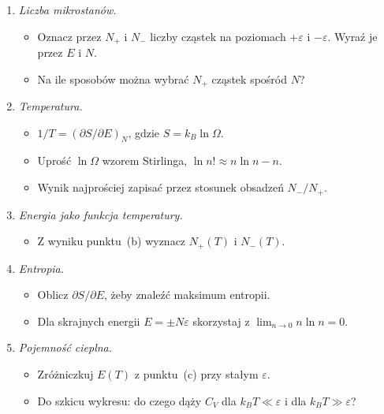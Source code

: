 \begin{wskazowki}
\begin{enumerate}[label=(\alph*)]
  \item \textit{Liczba mikrostanów.}
    \begin{itemize}
      \item Oznacz przez $N_+$ i $N_-$ liczby cząstek na poziomach $+\varepsilon$
        i $-\varepsilon$. Wyraź je przez $E$ i $N$.
      \item Na ile sposobów można wybrać $N_+$ cząstek spośród $N$?
    \end{itemize}
  \item \textit{Temperatura.}
    \begin{itemize}
      \item $1/T = (\partial S/\partial E)_N$, gdzie $S = k_B\ln\Omega$.
      \item Uprość $\ln\Omega$ wzorem Stirlinga, $\ln n! \approx n\ln n - n$.
      \item Wynik najprościej zapisać przez stosunek obsadzeń $N_-/N_+$.
    \end{itemize}
  \item \textit{Energia jako funkcja temperatury.}
    \begin{itemize}
      \item Z wyniku punktu~(b) wyznacz $N_+(T)$ i $N_-(T)$.
    \end{itemize}
  \item \textit{Entropia.}
    \begin{itemize}
      \item Oblicz $\partial S/\partial E$, żeby znaleźć maksimum entropii.
      \item Dla skrajnych energii $E = \pm N\varepsilon$ skorzystaj
        z $\lim_{n\to 0} n\ln n = 0$.
    \end{itemize}
  \item \textit{Pojemność cieplna.}
    \begin{itemize}
      \item Zróżniczkuj $E(T)$ z punktu~(c) przy stałym $\varepsilon$.
      \item Do szkicu wykresu: do czego dąży $C_V$ dla $k_BT \ll \varepsilon$
        i dla $k_BT \gg \varepsilon$?
    \end{itemize}
\end{enumerate}
\end{wskazowki}
